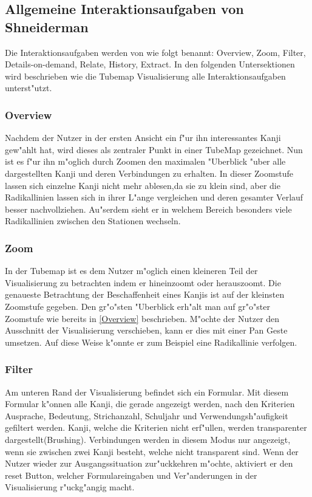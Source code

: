 \subsection{Allgemeine Interaktionsaufgaben von Shneiderman}
Die Interaktionsaufgaben werden von \cite{eyeshaveit96} wie folgt benannt: Overview, Zoom, Filter, Details-on-demand, Relate, History, Extract.  In den folgenden Untersektionen wird beschrieben wie die Tubemap Visualisierung alle Interaktionsaufgaben unterst"utzt. 

\subsubsection{Overview}
Nachdem der Nutzer in der ersten Ansicht ein f"ur ihn interessantes Kanji gew"ahlt hat, wird dieses als zentraler Punkt in einer TubeMap gezeichnet. Nun ist es f"ur ihn m"oglich durch Zoomen den maximalen "Uberblick "uber alle dargestellten Kanji und deren Verbindungen zu erhalten. In dieser Zoomstufe lassen sich einzelne Kanji nicht mehr ablesen,da sie zu klein sind, aber die Radikallinien lassen sich in ihrer L"ange vergleichen und deren gesamter Verlauf besser nachvollziehen. Au"serdem sieht er in welchem Bereich besonders viele Radikallinien zwischen den Stationen wechseln.

\subsubsection{Zoom}
In der Tubemap ist es dem Nutzer m"oglich einen kleineren Teil der Visualisierung zu betrachten indem er hineinzoomt oder herauszoomt. Die genaueste Betrachtung der Beschaffenheit eines Kanjis ist auf der kleinsten Zoomstufe gegeben. Den gr"o"sten "Uberblick erh"alt man auf gr"o"ster Zoomstufe wie bereits in \ref{Overview} beschrieben. M"ochte der Nutzer den Ausschnitt der Visualisierung verschieben, kann er dies mit einer Pan Geste umsetzen. Auf diese Weise k"onnte er zum Beispiel eine Radikallinie verfolgen.

\subsubsection{Filter}
Am unteren Rand der Visualisierung befindet sich ein Formular. Mit diesem Formular k"onnen alle Kanji, die gerade angezeigt werden, nach den Kriterien Ausprache, Bedeutung, Strichanzahl, Schuljahr und Verwendungsh"aufigkeit gefiltert werden. Kanji, welche die Kriterien nicht erf"ullen, werden transparenter dargestellt(Brushing). Verbindungen werden in diesem Modus nur angezeigt, wenn sie zwischen zwei Kanji besteht, welche nicht transparent sind. Wenn der Nutzer wieder zur Ausgangssituation zur"uckkehren m"ochte, aktiviert er den reset Button, welcher Formulareingaben und Ver"anderungen in der Visualisierung r"uckg"angig macht.

